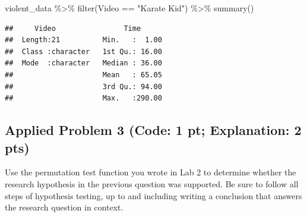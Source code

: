 \documentclass[
]{article}
\newenvironment{Shaded}{\begin{snugshade}}{\end{snugshade}}
\newcommand{\FunctionTok}[1]{\textcolor[rgb]{0.00,0.00,0.00}{#1}}
\newcommand{\NormalTok}[1]{#1}
\newcommand{\SpecialCharTok}[1]{\textcolor[rgb]{0.00,0.00,0.00}{#1}}
\newcommand{\StringTok}[1]{\textcolor[rgb]{0.31,0.60,0.02}{#1}}
\begin{document}
\begin{Shaded}
\begin{Highlighting}[]
\NormalTok{violent\_data }\SpecialCharTok{\%\textgreater{}\%} 
  \FunctionTok{filter}\NormalTok{(Video }\SpecialCharTok{==} \StringTok{"Karate Kid"}\NormalTok{) }\SpecialCharTok{\%\textgreater{}\%} 
  \FunctionTok{summary}\NormalTok{()}
\end{Highlighting}
\end{Shaded}

\begin{verbatim}
##     Video                Time       
##  Length:21          Min.   :  1.00  
##  Class :character   1st Qu.: 16.00  
##  Mode  :character   Median : 36.00  
##                     Mean   : 65.05  
##                     3rd Qu.: 94.00  
##                     Max.   :290.00
\end{verbatim}

\hypertarget{applied-problem-3-code-1-pt-explanation-2-pts}{%
\subsection{Applied Problem 3 (Code: 1 pt; Explanation: 2
pts)}\label{applied-problem-3-code-1-pt-explanation-2-pts}}

Use the permutation test function you wrote in Lab 2 to determine
whether the research hypothesis in the previous question was supported.
Be sure to follow all steps of hypothesis testing, up to and including
writing a conclusion that answers the research question in context.
\end{document}
